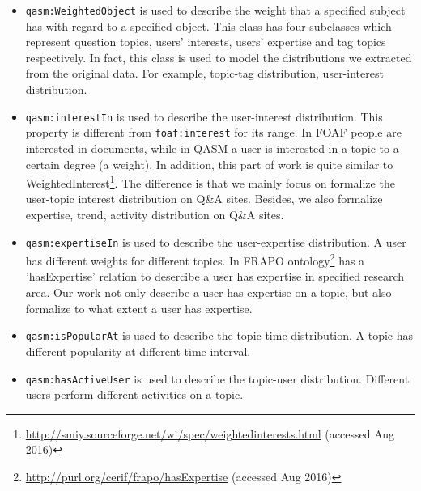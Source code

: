 \begin{itemize}

\item \texttt{qasm:WeightedObject} is used to describe the weight that a specified subject has with regard to a specified object. This class has four subclasses which represent question topics, users' interests, users' expertise and tag topics respectively. In fact, this class is used to model the distributions we extracted from the original data. For example, topic-tag distribution, user-interest distribution.

\item \texttt{qasm:interestIn} is used to describe the user-interest distribution. This property is different from \texttt{foaf:interest} for its range. In FOAF people are interested in documents, while in QASM a user is interested in a topic to a certain degree (a weight). In addition, this part of work is quite similar to WeightedInterest\footnote{\url{http://smiy.sourceforge.net/wi/spec/weightedinterests.html} (accessed Aug 2016)}. The difference is that we mainly focus on formalize the user-topic interest distribution on Q\&A sites. Besides, we also formalize expertise, trend, activity distribution on Q\&A sites.

\item \texttt{qasm:expertiseIn} is used to describe the user-expertise distribution. A user has different weights for different topics. In FRAPO ontology\footnote{\url{http://purl.org/cerif/frapo/hasExpertise} (accessed Aug 2016) } has a 'hasExpertise' relation to desercibe a user has expertise in specified research area. Our work not only describe a user has expertise on a topic, but also formalize to what extent a user has expertise.

\item \texttt{qasm:isPopularAt} is used to describe the topic-time distribution. A topic has different popularity at different time interval.

\item \texttt{qasm:hasActiveUser} is used to describe the topic-user distribution. Different users perform different activities on a topic.
\end{itemize}


